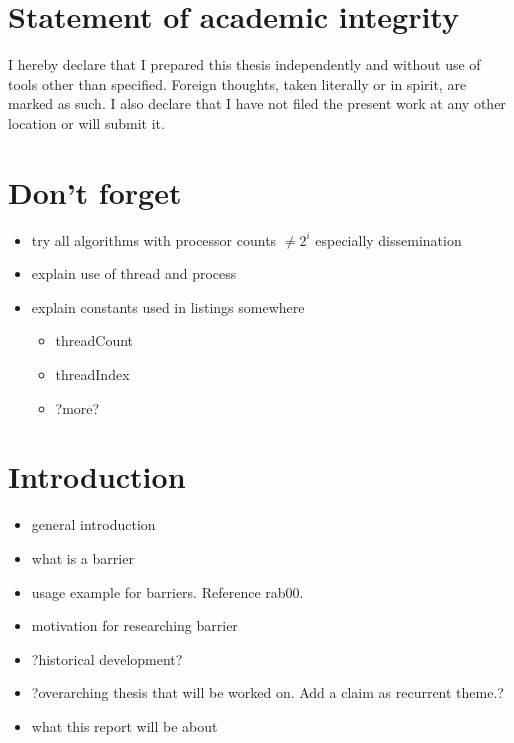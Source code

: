 \documentclass[a4paper, 10pt]{article}
\begin{document}
\section*{Statement of academic integrity}
I hereby declare that I prepared this thesis independently and without use of tools other than specified. Foreign thoughts, taken literally or in spirit, are marked as such. I also declare that I have not filed the present work at any other location or will submit it.

\pagebreak
\newpage \thispagestyle{empty} \mbox{}
\pagebreak

\renewcommand{\contentsname}{Table of contents}
\tableofcontents

\pagebreak
\newpage \thispagestyle{empty} \mbox{}
\pagebreak

\section{Don't forget}
\begin{itemize}
	\item try all algorithms with processor counts $\neq 2^i$ especially dissemination
	\item explain use of thread and process
	\item explain constants used in listings somewhere
		\begin{itemize}
			\item threadCount
			\item threadIndex
			\item ?more?
		\end{itemize}
\end{itemize}

\section{Introduction}
\begin{itemize}
	\item general introduction
	\item what is a barrier
	\item usage example for barriers. Reference rab00.
	\item motivation for researching barrier
	\item ?historical development?
	\item ?overarching thesis that will be worked on. Add a claim as recurrent theme.?
	\item what this report will be about
\end{itemize}
\end{document}
